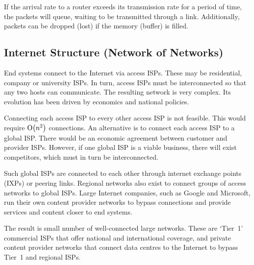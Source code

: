 If the arrival rate to a router exceeds its transmission rate for a period of time, the packets will queue, waiting to be transmitted through a link.
Additionally, packets can be dropped (lost) if the memory (buffer) is filled.

\subsection{Internet Structure (Network of Networks)}

End systems connect to the Internet via access ISPs.
These may be residential, company or university ISPs.
In turn, access ISPs must be interconnected so that any two hosts can communicate.
The resulting network is very complex.
Its evolution has been driven by economics and national policies.

Connecting each access ISP to every other access ISP is not feasible.
This would require \( \textup{O}\!\left( n^2 \right) \) connections.
An alternative is to connect each access ISP to a global ISP.
There would be an economic agreement between customer and provider ISPs.
However, if one global ISP is a viable business, there will exist competitors, which must in turn be interconnected.

Such global ISPs are connected to each other through internet exchange points (IXPs) or peering links.
Regional networks also exist to connect groups of access networks to global ISPs.
Large Internet companies, such as Google and Microsoft, run their own content provider networks to bypass connections and provide services and content closer to end systems.

The result is small number of well-connected large networks.
These are `Tier~1' commercial ISPs that offer national and international coverage, and private content provider networks that connect data centres to the Internet to bypass Tier~1 and regional ISPs.
